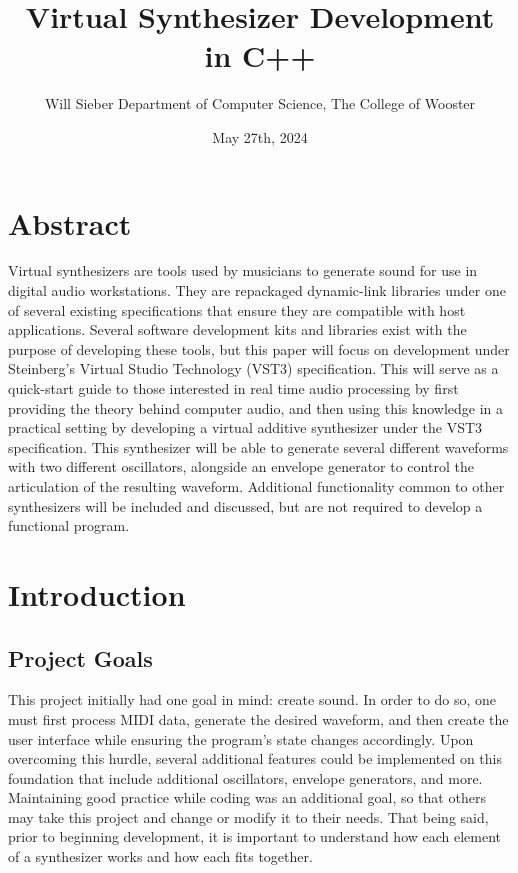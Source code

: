 \documentclass[12pt]{article}
\title{Virtual Synthesizer Development in C++}
\date{May 27th, 2024}
\author{\parbox{\linewidth}{\centering%
	Will Sieber
	\endgraf\bigskip
	Department of Computer Science, The College of Wooster
	\bigskip
}}
\begin{document}
\maketitle

\newpage
\tableofcontents

\section{Abstract}
Virtual synthesizers are tools used by musicians to generate sound for use in digital audio workstations. They are repackaged dynamic-link libraries under one of several existing specifications that ensure they are compatible with host applications. Several software development kits and libraries exist with the purpose of developing these tools, but this paper will focus on development under Steinberg's Virtual Studio Technology (VST3) specification. This will serve as a quick-start guide to those interested in real time audio processing by first providing the theory behind computer audio, and then using this knowledge in a practical setting by developing a virtual additive synthesizer under the VST3 specification. This synthesizer will be able to generate several different waveforms with two different oscillators, alongside an envelope generator to control the articulation of the resulting waveform. Additional functionality common to other synthesizers will be included and discussed, but are not required to develop a functional program.
\newpage

\section{Introduction}

\subsection{Project Goals}
This project initially had one goal in mind: create sound. In order to do so, one must first process MIDI data, generate the desired waveform, and then create the user interface while ensuring the program's state changes accordingly. Upon overcoming this hurdle, several additional features could be implemented on this foundation that include additional oscillators, envelope generators, and more. Maintaining good practice while coding was an additional goal, so that others may take this project and change or modify it to their needs. That being said, prior to beginning development, it is important to understand how each element of a synthesizer works and how each fits together. 
\end{document}

